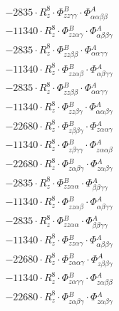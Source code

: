 \documentclass{article}
\begin{document}
\begin{subequations}
\begin{gather}
\begin{array}{c}
 \\[0.2em] 		 - 2835 \cdot R_{z}^{8} \cdot \Phi{}^{B}_{zz\gamma{}\gamma{}} \cdot \Phi{}^{A}_{\alpha{}\alpha{}\beta{}\beta{}} 
 \\[0.2em] 		 - 11340 \cdot R_{z}^{8} \cdot \Phi{}^{B}_{zz\alpha{}\gamma{}} \cdot \Phi{}^{A}_{\alpha{}\beta{}\beta{}\gamma{}} 
 \\[0.2em] 		 - 2835 \cdot R_{z}^{8} \cdot \Phi{}^{B}_{zz\beta{}\beta{}} \cdot \Phi{}^{A}_{\alpha{}\alpha{}\gamma{}\gamma{}} 
 \\[0.2em] 		 - 11340 \cdot R_{z}^{8} \cdot \Phi{}^{B}_{zz\alpha{}\beta{}} \cdot \Phi{}^{A}_{\alpha{}\beta{}\gamma{}\gamma{}} 
 \\[0.2em] 		 - 2835 \cdot R_{z}^{8} \cdot \Phi{}^{B}_{zz\beta{}\beta{}} \cdot \Phi{}^{A}_{\alpha{}\alpha{}\gamma{}\gamma{}} 
 \\[0.2em] 		 - 11340 \cdot R_{z}^{8} \cdot \Phi{}^{B}_{zz\beta{}\gamma{}} \cdot \Phi{}^{A}_{\alpha{}\alpha{}\beta{}\gamma{}} 
 \\[0.2em] 		 - 22680 \cdot R_{z}^{8} \cdot \Phi{}^{B}_{z\beta{}\beta{}\gamma{}} \cdot \Phi{}^{A}_{z\alpha{}\alpha{}\gamma{}} 
 \\[0.2em] 		 - 11340 \cdot R_{z}^{8} \cdot \Phi{}^{B}_{z\beta{}\gamma{}\gamma{}} \cdot \Phi{}^{A}_{z\alpha{}\alpha{}\beta{}} 
 \\[0.2em] 		 - 22680 \cdot R_{z}^{8} \cdot \Phi{}^{B}_{z\alpha{}\beta{}\gamma{}} \cdot \Phi{}^{A}_{z\alpha{}\beta{}\gamma{}} 
 \\[0.2em] 		 - 2835 \cdot R_{z}^{8} \cdot \Phi{}^{B}_{zz\alpha{}\alpha{}} \cdot \Phi{}^{A}_{\beta{}\beta{}\gamma{}\gamma{}} 
 \\[0.2em] 		 - 11340 \cdot R_{z}^{8} \cdot \Phi{}^{B}_{zz\alpha{}\beta{}} \cdot \Phi{}^{A}_{\alpha{}\beta{}\gamma{}\gamma{}} 
 \\[0.2em] 		 - 2835 \cdot R_{z}^{8} \cdot \Phi{}^{B}_{zz\alpha{}\alpha{}} \cdot \Phi{}^{A}_{\beta{}\beta{}\gamma{}\gamma{}} 
 \\[0.2em] 		 - 11340 \cdot R_{z}^{8} \cdot \Phi{}^{B}_{zz\alpha{}\gamma{}} \cdot \Phi{}^{A}_{\alpha{}\beta{}\beta{}\gamma{}} 
 \\[0.2em] 		 - 22680 \cdot R_{z}^{8} \cdot \Phi{}^{B}_{z\alpha{}\alpha{}\gamma{}} \cdot \Phi{}^{A}_{z\beta{}\beta{}\gamma{}} 
 \\[0.2em] 		 - 11340 \cdot R_{z}^{8} \cdot \Phi{}^{B}_{z\alpha{}\gamma{}\gamma{}} \cdot \Phi{}^{A}_{z\alpha{}\beta{}\beta{}} 
 \\[0.2em] 		 - 22680 \cdot R_{z}^{8} \cdot \Phi{}^{B}_{z\alpha{}\beta{}\gamma{}} \cdot \Phi{}^{A}_{z\alpha{}\beta{}\gamma{}} 

\end{array}
\end{gather}
\end{subequations}
\end{document}
